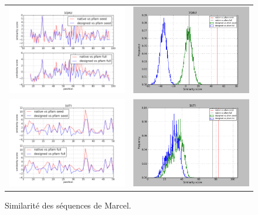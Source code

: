 \documentclass[a4paper,12pt]{article}
\begin{document}
   \begin{figure}[t]
     \centering
     \begin{tabular}{cc}
       \includegraphics[width=8.45cm]{marcel_seq/1QAU/graph_simil_bypos.png} &
       \includegraphics[width=8.45cm]{marcel_seq/1QAU/graph_simil_byseq.png} \\
       \includegraphics[width=8.45cm]{marcel_seq/1UTI/graph_simil_bypos.png} &
       \includegraphics[width=8.45cm]{marcel_seq/1UTI/graph_simil_byseq.png} \\

     \end{tabular}

     \caption{Similarité des séquences de Marcel.}

   \end{figure}
\end{document}
